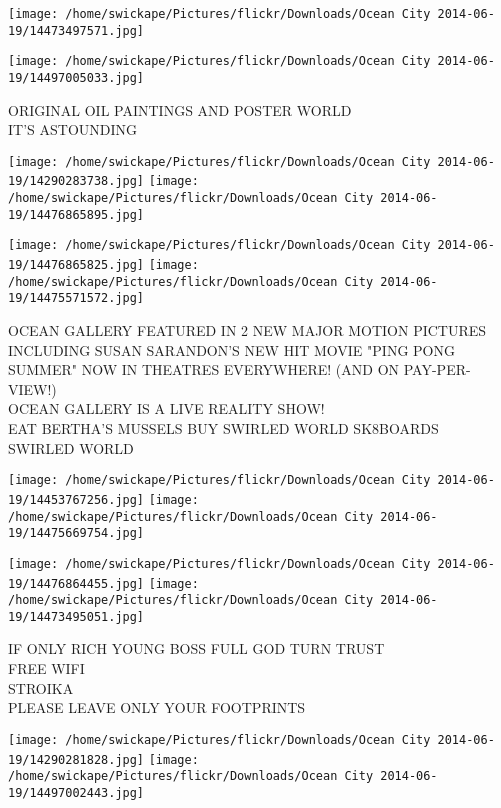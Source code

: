 \documentclass[10pt,letterpaper]{article}
\begin{document}
\texttt{[image: /home/swickape/Pictures/flickr/Downloads/Ocean City 2014-06-19/14473497571.jpg]}

\vspace{0.25in}
\texttt{[image: /home/swickape/Pictures/flickr/Downloads/Ocean City 2014-06-19/14497005033.jpg]}

ORIGINAL OIL PAINTINGS AND POSTER WORLD\\
IT'S ASTOUNDING\\
\pagebreak

\texttt{[image: /home/swickape/Pictures/flickr/Downloads/Ocean City 2014-06-19/14290283738.jpg]}
\texttt{[image: /home/swickape/Pictures/flickr/Downloads/Ocean City 2014-06-19/14476865895.jpg]}

\texttt{[image: /home/swickape/Pictures/flickr/Downloads/Ocean City 2014-06-19/14476865825.jpg]}
\texttt{[image: /home/swickape/Pictures/flickr/Downloads/Ocean City 2014-06-19/14475571572.jpg]}

OCEAN GALLERY FEATURED IN 2 NEW MAJOR MOTION PICTURES INCLUDING SUSAN SARANDON'S NEW HIT MOVIE "PING PONG SUMMER" NOW IN THEATRES EVERYWHERE!  (AND ON PAY{-}PER{-}VIEW!)\\
OCEAN GALLERY IS A LIVE REALITY SHOW!\\
EAT BERTHA'S MUSSELS BUY SWIRLED WORLD SK8BOARDS\\
SWIRLED WORLD\\
\pagebreak

\texttt{[image: /home/swickape/Pictures/flickr/Downloads/Ocean City 2014-06-19/14453767256.jpg]}
\texttt{[image: /home/swickape/Pictures/flickr/Downloads/Ocean City 2014-06-19/14475669754.jpg]}

\texttt{[image: /home/swickape/Pictures/flickr/Downloads/Ocean City 2014-06-19/14476864455.jpg]}
\texttt{[image: /home/swickape/Pictures/flickr/Downloads/Ocean City 2014-06-19/14473495051.jpg]}

IF ONLY RICH YOUNG BOSS FULL GOD TURN TRUST\\
FREE WIFI\\
STROIKA\\
PLEASE LEAVE ONLY YOUR FOOTPRINTS\\
\pagebreak

\texttt{[image: /home/swickape/Pictures/flickr/Downloads/Ocean City 2014-06-19/14290281828.jpg]}
\texttt{[image: /home/swickape/Pictures/flickr/Downloads/Ocean City 2014-06-19/14497002443.jpg]}
\end{document}
